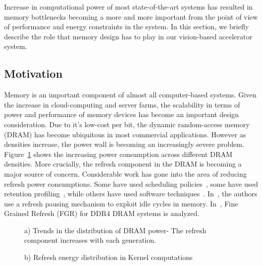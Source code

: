 Increase in computational power of most state-of-the-art systems has resulted in memory bottlenecks becoming a more and more important from the point of view of performance and energy constraints in the system.
In this section, we briefly describe the role that memory design has to play in our vision-based accelerator system.

\subsection{Motivation}
Memory is an important component of almost all computer-based systems. Given the increase in cloud-computing and server farms, the scalability in terms of power and performance of memory devices has become an important design consideration. Due to it's low-cost per bit, the dynamic random-access memory (DRAM) has become ubiquitous in most commercial applications. However as densities increase, the power wall is becoming an increasingly severe problem. Figure~\ref{fig:refreshTrends} shows the increasing power consumption across different DRAM densities. More crucially, the refresh component in the DRAM is becoming a major source of concern. 
Considerable work has gone into the area of reducing refresh power consumptions. Some have used scheduling policies~\cite{Stuecheli2010}, some have used retention profiling~\cite{Liu2012}, while others have used software techniques~\cite{Liu2012}. In~\cite{Nair2013}, the authors use a refresh pausing mechanism to exploit idle cycles in memory. In~\cite{Mukundan2013}, Fine Grained Refresh (FGR) for DDR4 DRAM systems is analyzed.  


\begin{figure}[ht!]
\begin{minipage}[b]{1\linewidth}
\centering
{}
\caption{\label{fig:refreshTrends}a) Trends in the distribution of DRAM power- The refresh component increases with each generation.}
\end{minipage}
\begin{minipage}[b]{1\linewidth}
\centering
{}
\caption{\label{fig:refreshTrends}b) Refresh energy distribution in Kernel computations}
\end{minipage}
\end{figure}

